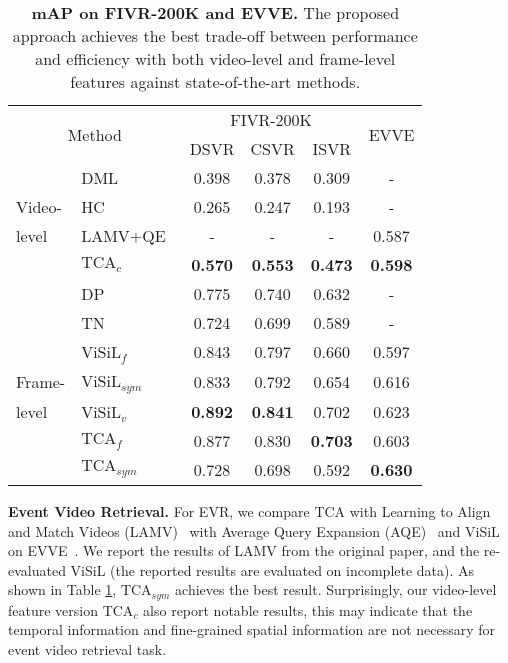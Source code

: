 \documentclass[10pt,twocolumn,letterpaper]{article}
\begin{document}
\begin{table}[htb]
\setlength{\tabcolsep}{5.25pt}
{\small
\begin{tabular}{llcccc}
\toprule
\multicolumn{2}{c}{\multirow{2}{*}{Method}} & \multicolumn{3}{c}{FIVR-200K} & \multirow{2}{*}{EVVE} \\
\cmidrule{3-5}
\multicolumn{2}{c}{}                        & DSVR     & CSVR     & ISVR   \\
\midrule
                    & DML~\cite{kordopatis2017dml}                   & 0.398    & 0.378    & 0.309  & - \\
Video-              & HC~\cite{song2013effective}                    & 0.265    & 0.247    & 0.193  & - \\
level               & LAMV+QE~\cite{baraldi2018lamv}                 & -        & -        & -      & 0.587 \\
                    & $\text{TCA}_c$         & \textbf{0.570}   & \textbf{0.553}   & \textbf{0.473}    & \textbf{0.598} \\
\cmidrule{1-6}
                    & DP~\cite{chou2015pattern}                         & 0.775    & 0.740    & 0.632   & -     \\
                    & TN~\cite{tan2009scalable}                         & 0.724    & 0.699    & 0.589   & -     \\
                    & $\text{ViSiL}_f$~\cite{kordopatis2019visil}       & 0.843    & 0.797    & 0.660   & 0.597 \\
Frame-              & $\text{ViSiL}_{sym}$~\cite{kordopatis2019visil}   & 0.833    & 0.792    & 0.654   & 0.616 \\
level               & $\text{ViSiL}_v$~\cite{kordopatis2019visil}       & \textbf{0.892}      & \textbf{0.841}    & 0.702   & 0.623 \\
                    & $\text{TCA}_f$         & 0.877    & 0.830    & \textbf{0.703}    & 0.603 \\
                    & $\text{TCA}_{sym}$         & 0.728    & 0.698    & 0.592    & \textbf{0.630} \\
\bottomrule
\end{tabular}
}
\caption{\textbf{mAP on FIVR-200K and EVVE.} The proposed approach achieves the best trade-off between performance and efficiency with both video-level and frame-level features against state-of-the-art methods.} \label{tab:fivr}
\end{table}

\noindent\textbf{Event Video Retrieval.} \label{paragraph:evr}
For EVR, we compare TCA with Learning to Align and Match Videos (LAMV)~\cite{baraldi2018lamv} with Average Query Expansion (AQE)~\cite{douze2013stable} and ViSiL~\cite{kordopatis2019visil} on EVVE~\cite{revaud2013event}. We report the results of LAMV from the original paper, and the re-evaluated ViSiL (the reported results are evaluated on incomplete data). As shown in Table \ref{tab:fivr}, $\text{TCA}_{sym}$ achieves the best result. Surprisingly, our video-level feature version $\text{TCA}_{c}$ also report notable results, this may indicate that the temporal information and fine-grained spatial information are not necessary for event video retrieval task.
\end{document}
